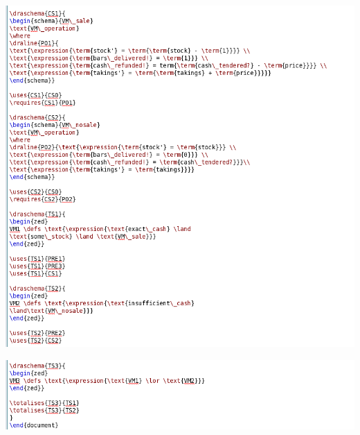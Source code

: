 \noindent \includegraphics[scale=0.5]{examples/vm/1n2imageb.png}

\noindent \includegraphics[scale=0.5]{examples/vm/1n2imagec.png}

%
